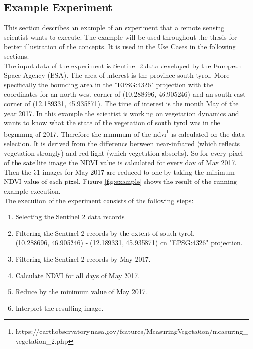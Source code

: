\documentclass[draft,final]{vutinfth} %
\begin{document}
\subsection{Example Experiment}\label{example}

This section describes an example of an experiment that a remote sensing scientist wants to execute. The example will be used throughout the thesis for better illustration of the concepts. It is used in the Use Cases in the following sections. \\
The input data of the experiment is Sentinel 2 data developed by the European Space Agency (ESA). The area of interest is the province south tyrol. More specifically the bounding area in the "EPSG:4326" projection with the coordinates for an north-west corner of (10.288696, 46.905246) and an south-east corner of (12.189331, 45.935871). The time of interest is the month May of the year 2017. In this example the scientist is working on vegetation dynamics and wants to know what the state of the vegetation of south tyrol was in the beginning of 2017. Therefore the minimum of the  \gls{ndvi}\footnote{https://earthobservatory.nasa.gov/features/MeasuringVegetation/measuring\_vegetation\_2.php} is calculated on the data selection. It is derived from the difference between near-infrared (which reflects vegetation strongly) and red light (which vegetation absorbs). So for every pixel of the satellite image the NDVI value is calculated for every day of May 2017. Then the 31 images for May 2017 are reduced to one by taking the minimum NDVI value of each pixel. Figure \ref{fig:example} shows the result of the running example execution.\\

The execution of the experiment consists of the following steps:

\begin{enumerate}
	\item Selecting the Sentinel 2 data records
	\item Filtering the Sentinel 2 records by the extent of south tyrol. \\(10.288696, 46.905246) - (12.189331, 45.935871) on "EPSG:4326" projection.
	\item Filtering the Sentinel 2 records by May 2017.
	\item Calculate NDVI for all days of May 2017.
	\item Reduce by the minimum value of May 2017.
	\item Interpret the resulting image.
\end{enumerate}
\end{document}
